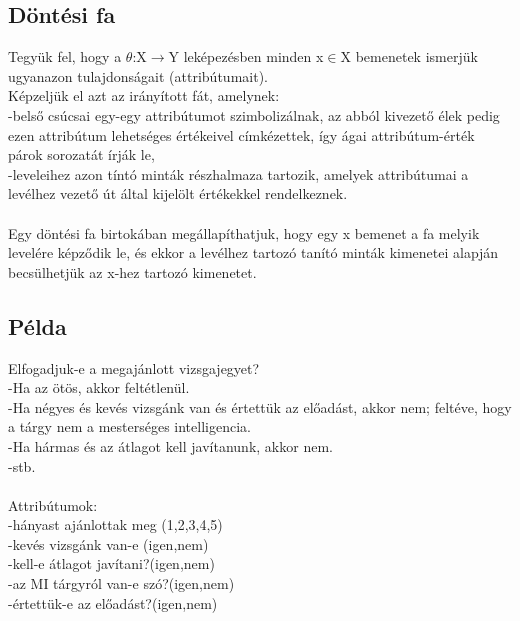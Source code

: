 \documentclass{article}
\begin{document}
	 \subsection{Döntési fa}
	 Tegyük fel, hogy a $\theta$:X$\rightarrow$Y leképezésben minden x$\in$X bemenetek ismerjük ugyanazon tulajdonságait (attribútumait).\\
	 Képzeljük el azt az irányított fát, amelynek:\\
	 -belső csúcsai egy-egy attribútumot szimbolizálnak, az abból kivezető élek pedig ezen attribútum lehetséges értékeivel címkézettek, így ágai attribútum-érték párok sorozatát írják le,\\
	 -leveleihez azon tíntó minták részhalmaza tartozik, amelyek attribútumai a levélhez vezető út által kijelölt értékekkel rendelkeznek.\\ \\
	 Egy döntési fa birtokában megállapíthatjuk, hogy egy x bemenet a fa melyik levelére képződik le, és ekkor a levélhez tartozó tanító minták kimenetei alapján becsülhetjük az x-hez tartozó kimenetet.\\
	 
	 \subsection{Példa}
	 Elfogadjuk-e a megajánlott vizsgajegyet?\\
	 -Ha az ötös, akkor feltétlenül.\\
	 -Ha négyes és kevés vizsgánk van és értettük az előadást, akkor nem; feltéve, hogy a tárgy nem a mesterséges intelligencia.\\
	 -Ha hármas és az átlagot kell javítanunk, akkor nem.\\
	 -stb.\\ \\
	 Attribútumok:\\
	 -hányast ajánlottak meg (1,2,3,4,5)\\
	 -kevés vizsgánk van-e (igen,nem)\\
	 -kell-e átlagot javítani?(igen,nem)\\
	 -az MI tárgyról van-e szó?(igen,nem)\\
	 -értettük-e az előadást?(igen,nem)\\
	 
\end{document}
